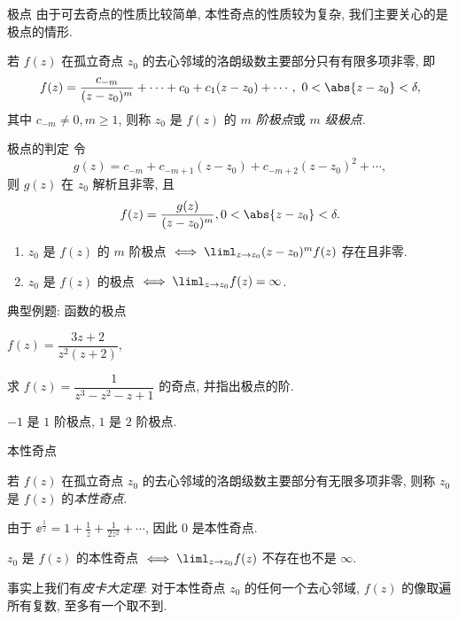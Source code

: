 \begin{frame}{极点}
	\onslide<+->
	由于可去奇点的性质比较简单, 本性奇点的性质较为复杂, 我们主要关心的是极点的情形.
	\onslide<+->
	\begin{definition}
		若 $f(z)$ 在孤立奇点 $z_0$ 的去心邻域的洛朗级数主要部分只有有限多项非零, 即
		\[
			f(z)=\frac{c_{-m}}{(z-z_0)^m}+\cdots+c_0+c_1(z-z_0)+\cdots,\ 0<\abs{z-z_0}<\delta,
		\]
		其中 $c_{-m}\neq 0,m\ge 1$, 则称 $z_0$ 是 $f(z)$ 的 \emph{$m$ 阶极点}或 \emph{$m$ 级极点}.
	\end{definition}
\end{frame}


\begin{frame}{极点的判定}
	\onslide<+->
	令
	\[
		g(z)=c_{-m}+c_{-m+1}(z-z_0)+c_{-m+2}(z-z_0)^2+\cdots,
	\]
	则 $g(z)$ 在 $z_0$ 解析且非零,
	\onslide<+->
	且
	\[
		f(z)=\dfrac{g(z)}{(z-z_0)^m},0<\abs{z-z_0}<\delta.
	\]
	\onslide<+->
	\begin{theorem}
		\begin{enumerate}
			\item $z_0$ 是 $f(z)$ 的 $m$ 阶极点 $\iff\liml_{z\to z_0}(z-z_0)^mf(z)$ 存在且非零.
			\item $z_0$ 是 $f(z)$ 的极点 $\iff\liml_{z\to z_0}f(z)=\infty$.
		\end{enumerate}
	\end{theorem}
\end{frame}


\begin{frame}{典型例题: 函数的极点}
	\onslide<+->
	\begin{example}
		$f(z)=\dfrac{3z+2}{z^2(z+2)}$,
		\onslide<+->{%
			同理 $-2$ 是 $1$ 阶极点.
		}
	\end{example}
	\onslide<+->
	\begin{exercise}[nearnext]
		求 $f(z)=\dfrac1{z^3-z^2-z+1}$ 的奇点, 并指出极点的阶.
	\end{exercise}
	\onslide<+->
	\begin{answer}[nearprev]
		$-1$ 是 $1$ 阶极点, $1$ 是 $2$ 阶极点.
	\end{answer}
\end{frame}


\begin{frame}{本性奇点}
	\onslide<+->
	\begin{definition}
		若 $f(z)$ 在孤立奇点 $z_0$ 的去心邻域的洛朗级数主要部分有无限多项非零, 则称 $z_0$ 是 $f(z)$ 的\emph{本性奇点}.
	\end{definition}
	\onslide<+->
	\begin{example}
		由于 $\displaystyle \ee^{\frac1z}=1+\frac1z+\frac1{2z^2}+\cdots$, 因此 $0$ 是本性奇点.
	\end{example}
	\onslide<+->
	\begin{theorem}
		$z_0$ 是 $f(z)$ 的本性奇点 $\iff\liml_{z\to z_0}f(z)$ 不存在也不是 $\infty$.
	\end{theorem}
	\onslide<+->
	事实上我们有\emph{皮卡大定理}: 对于本性奇点 $z_0$ 的任何一个去心邻域, $f(z)$ 的像取遍所有复数, 至多有一个取不到.
\end{frame}



